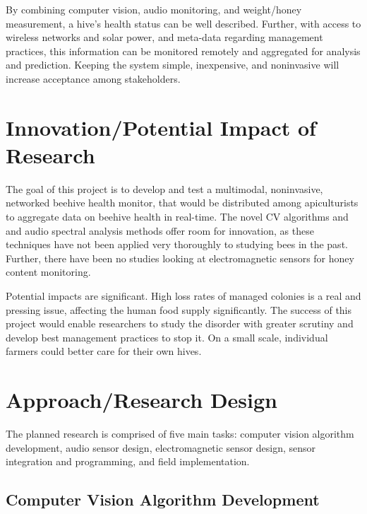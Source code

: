 By combining computer vision, audio monitoring, and weight/honey measurement,  a hive's health status can be well described. Further, with access to wireless networks and solar power, and meta-data regarding management practices, this information can be monitored remotely and aggregated for analysis and prediction. Keeping the system simple, inexpensive, and noninvasive will increase acceptance among stakeholders.

\section{Innovation/Potential Impact of Research}

The goal of this project is to develop and test a multimodal, noninvasive, networked beehive health monitor, that would be distributed among apiculturists to aggregate data on beehive health in real-time. The novel CV algorithms and and audio spectral analysis methods offer room for innovation, as these techniques have not been applied very thoroughly to studying bees in the past. Further, there have been no studies looking at electromagnetic sensors for honey content monitoring.

Potential impacts are significant. High loss rates of managed colonies is a real and pressing issue, affecting the human food supply significantly. The success of this project would enable researchers to study the disorder with greater scrutiny and develop best management practices to stop it. On a small scale, individual farmers could better care for their own hives.

\section{Approach/Research Design}

The planned research is comprised of five main tasks: computer vision algorithm development, audio sensor design, electromagnetic sensor design, sensor integration and programming, and field implementation.

\subsection{Computer Vision Algorithm Development}

